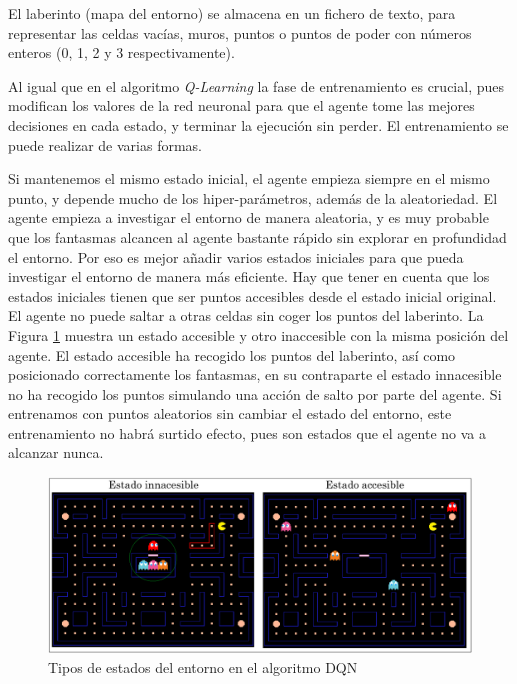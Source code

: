 		
		El laberinto (mapa del entorno) se almacena en un fichero de texto, para representar las celdas vacías, muros, puntos o puntos de poder con números enteros (0, 1, 2 y 3 respectivamente).
		
		
		Al igual que en el algoritmo \textit{Q-Learning} la fase de entrenamiento es crucial, pues modifican los valores de la red neuronal para que el agente tome las mejores decisiones en cada estado, y terminar la ejecución sin perder. El entrenamiento se puede realizar de varias formas.	
			
							
		Si mantenemos el mismo estado inicial, el agente empieza siempre en el mismo punto, y depende mucho de los hiper-parámetros, además de la aleatoriedad. El agente empieza a investigar el entorno de manera aleatoria, y es muy probable que los fantasmas alcancen al agente bastante rápido sin explorar en profundidad el entorno. Por eso es mejor añadir varios estados iniciales para que pueda investigar el entorno de manera más eficiente. Hay que tener en cuenta que los estados iniciales tienen que ser puntos accesibles desde el estado inicial original. El agente no puede saltar a otras celdas sin coger los puntos del laberinto. La Figura \ref{fig:pacman_states} muestra un estado accesible y otro inaccesible con la misma posición del agente. El estado accesible ha recogido los puntos del laberinto, así como posicionado correctamente los fantasmas, en su contraparte el estado innacesible no ha recogido los puntos simulando una acción de salto por parte del agente. Si entrenamos con puntos aleatorios sin cambiar el estado del entorno, este entrenamiento no habrá surtido efecto, pues son estados que el agente no va a alcanzar nunca.
			
		
		\begin{figure}[!h]
			\centering
			\includegraphics[width=1\textwidth]{images/chapter_3/pacman_states}	
			\caption{Tipos de estados del entorno en el algoritmo DQN}
			\label{fig:pacman_states}
		\end{figure}
		
